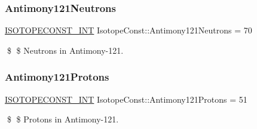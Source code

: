 \subsubsection{\texorpdfstring{Antimony121\+Neutrons}{Antimony121Neutrons}}
{\footnotesize\ttfamily \mbox{\hyperlink{group___isotope_const-_macros_ga5f18360b3e99483a35c32d789e62621c}{I\+S\+O\+T\+O\+P\+E\+C\+O\+N\+S\+T\+\_\+\+I\+NT}} Isotope\+Const\+::\+Antimony121\+Neutrons = 70}

\$ \$ Neutrons in Antimony-\/121. \mbox{\label{group___isotope_const-_antimony-_sb121_gad40102ab37d411f44792cf02bea420c2}} 
\subsubsection{\texorpdfstring{Antimony121\+Protons}{Antimony121Protons}}
{\footnotesize\ttfamily \mbox{\hyperlink{group___isotope_const-_macros_ga5f18360b3e99483a35c32d789e62621c}{I\+S\+O\+T\+O\+P\+E\+C\+O\+N\+S\+T\+\_\+\+I\+NT}} Isotope\+Const\+::\+Antimony121\+Protons = 51}

\$ \$ Protons in Antimony-\/121. 